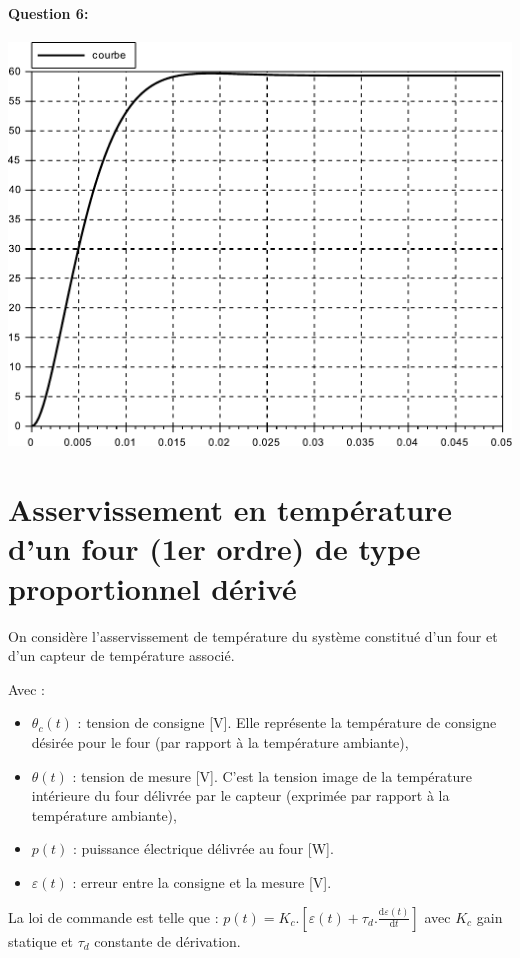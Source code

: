 \paragraph{Question 6:} 

\begin{center}
 \includegraphics[width=0.8\linewidth]{img/Figure_moteur_charge}
\end{center}




\section{Asservissement en température d'un four (1er ordre) de type proportionnel dérivé}

On considère l'asservissement de température du système constitué d'un four et d'un capteur de température associé.

Avec : 
\begin{itemize}
 \item $\theta_c(t)$ : tension de consigne [V]. Elle représente la température de consigne désirée pour le four (par rapport à la température ambiante),
 \item $\theta(t)$ : tension de mesure [V]. C'est la tension image de la température intérieure du four délivrée par le capteur (exprimée par rapport à la température ambiante),
 \item $p(t)$ : puissance électrique délivrée au four [W]. 
 \item $\varepsilon(t)$ : erreur entre la consigne et la mesure [V].
\end{itemize}

La loi de commande est telle que : 
$p(t)=K_c.[\varepsilon(t)+\tau_d.\frac{\mathrm{d}\varepsilon(t)}{\mathrm{d}t}]$ avec $K_c$ gain statique et $\tau_d$ constante de dérivation.

